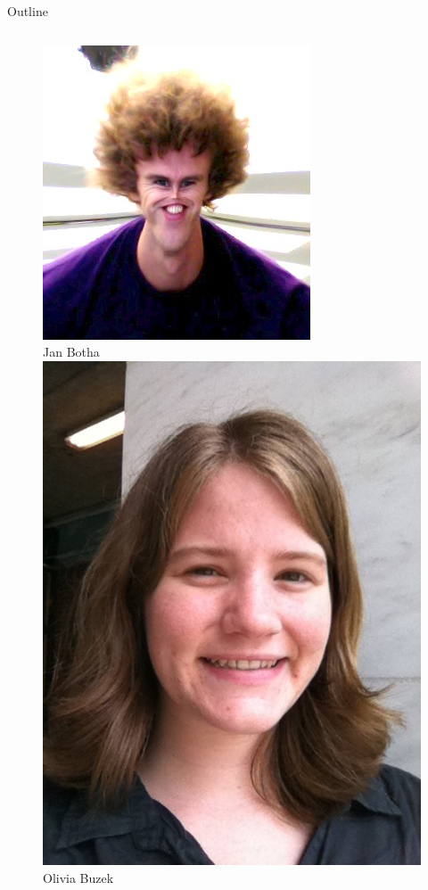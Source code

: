 \documentclass{beamer}
\begin{document}
\begin{frame}[t]{Outline}
\begin{columns}
\begin{column}{0.2\textwidth}
\begin{exampleblock}{}
\begin{figure}
        {\centering \includegraphics[scale=0.11]{jan.jpg}} \\
        Jan Botha \\
        
        {\centering \includegraphics[scale=0.06]{olivia.jpg}} \\
        Olivia Buzek\\
        

\end{figure}
\end{exampleblock}
\end{column}
\end{columns}
\end{frame}
\end{document}

